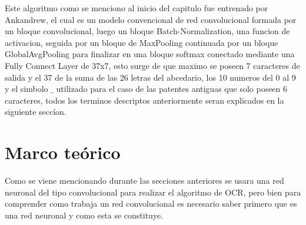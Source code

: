 Este algoritmo como se menciono al inicio del capitulo fue entrenado por Ankandrew, el cual es un modelo convencional de red convolucional
formada por un bloque convolucional, luego un bloque Batch-Normalization, una funcion de activacion, seguida por un bloque de MaxPooling
continuada por un bloque GlobalAvgPooling para finalizar en una bloque softmax conectado mediante una Fully Connect Layer de 37x7, esto surge de que maximo se poseen 7 caracteres
de salida y el 37 de la suma de las 26 letras del abcedario, los 10 numeros del 0 al 9 y el simbolo $\_$ utilizado para el caso de las patentes antiguas
que solo poseen 6 caracteres, todos los terminos descriptos anteriormente seran explicados en la siguiente seccíon.

\section{Marco teórico}
Como se viene mencionando durante las secciones anteriores se usara una red neuronal del tipo convolucional para realizar el algoritmo de OCR,
pero bien para comprender como trabaja un red convolucional es necesario saber primero que es una red neuronal y como esta se constituye.

